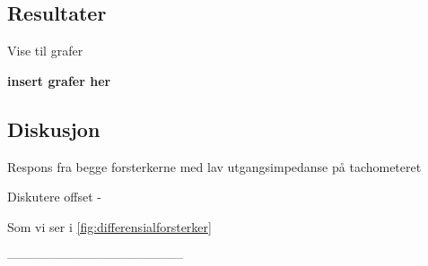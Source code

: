 \subsection{Resultater}
Vise til grafer

\textbf{insert grafer her}



\subsection{Diskusjon}

Respons fra begge forsterkerne med lav utgangsimpedanse på tachometeret

Diskutere offset
- 

Som vi ser i  \autoref{fig:differensialforsterker}


------------------------------------------









